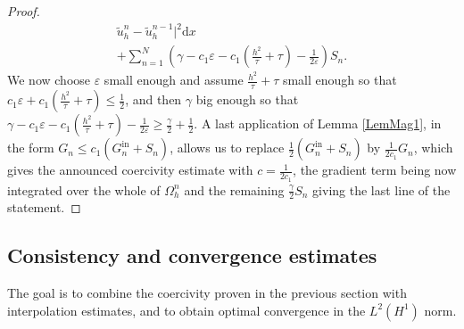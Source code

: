 \documentclass[11pt,a4paper]{article}
\theoremstyle{plain}
\theoremstyle{definition}
\theoremstyle{remark}
\numberwithin{equation}{section}
\newcommand{\dx}{\mathrm{d}x}
\begin{document}
\begin{proof}
\begin{multline*}
	\tilde{u}_h^n - \tilde{u}_h^{n - 1} |^2 \dx \\
	+ \sum_{n = 1}^N \left( \gamma -c_1\varepsilon - c_1\left(\frac{h^2}{\tau}+\tau\right) - \frac{1}{2 \varepsilon} \right) S_n .
\end{multline*}
    We now choose $\varepsilon$ small enough and assume $\frac{h^2}{\tau}+\tau$ small enough so that $c_1\varepsilon+c_1\left(\frac{h^2}{\tau}+\tau\right)\leqslant \frac12$, and then $\gamma$ big enough so that $\gamma-c_1\varepsilon-c_1\left(\frac{h^2}{\tau}+\tau\right)-\frac{1}{2\varepsilon}\geqslant \frac{\gamma}{2}+\frac12$. A last application of Lemma \ref{LemMag1}, in the form $G_n \leqslant c_1 (G_n^{\mathrm{in}} + S_n)$, allows us to replace $\frac12 (G_n^{\mathrm{in}} + S_n)$ by $\frac{1}{2c_1} G_n$, which gives the announced coercivity estimate with $c=\frac{1}{2c_1}$, the gradient term being now integrated over the whole of $\Omega_h^n$ and the remaining $\frac{\gamma}{2}S_n$ giving the last line of the statement.
\end{proof}

\subsection{Consistency and convergence estimates}
\label{Sect:Consistency}


The goal is to combine the coercivity proven in the previous section with
interpolation estimates, and to obtain optimal convergence in the $L^2 (H^1)$ norm.
\end{document}
